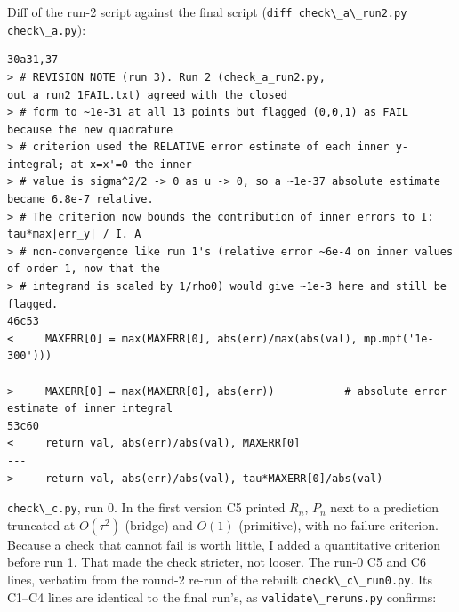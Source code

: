 \documentclass[11pt,a4paper]{article}
\newcommand{\passthrough}[1]{#1}
\begin{document}
Diff of the run-2 script against the final script
(\passthrough{\lstinline!diff check\_a\_run2.py check\_a.py!}):

\begin{lstlisting}
30a31,37
> # REVISION NOTE (run 3). Run 2 (check_a_run2.py, out_a_run2_1FAIL.txt) agreed with the closed
> # form to ~1e-31 at all 13 points but flagged (0,0,1) as FAIL because the new quadrature
> # criterion used the RELATIVE error estimate of each inner y-integral; at x=x'=0 the inner
> # value is sigma^2/2 -> 0 as u -> 0, so a ~1e-37 absolute estimate became 6.8e-7 relative.
> # The criterion now bounds the contribution of inner errors to I: tau*max|err_y| / I. A
> # non-convergence like run 1's (relative error ~6e-4 on inner values of order 1, now that the
> # integrand is scaled by 1/rho0) would give ~1e-3 here and still be flagged.
46c53
<     MAXERR[0] = max(MAXERR[0], abs(err)/max(abs(val), mp.mpf('1e-300')))
---
>     MAXERR[0] = max(MAXERR[0], abs(err))           # absolute error estimate of inner integral
53c60
<     return val, abs(err)/abs(val), MAXERR[0]
---
>     return val, abs(err)/abs(val), tau*MAXERR[0]/abs(val)
\end{lstlisting}

\passthrough{\lstinline!check\_c.py!}, run 0. In the first version C5
printed \(R_n\), \(P_n\) next to a prediction truncated at \(O(\tau^2)\)
(bridge) and \(O(1)\) (primitive), with no failure criterion. Because a
check that cannot fail is worth little, I added a quantitative criterion
before run 1. That made the check stricter, not looser. The run-0 C5 and
C6 lines, verbatim from the round-2 re-run of the rebuilt
\passthrough{\lstinline!check\_c\_run0.py!}. Its C1--C4 lines are
identical to the final run's, as
\passthrough{\lstinline!validate\_reruns.py!} confirms:
\end{document}
